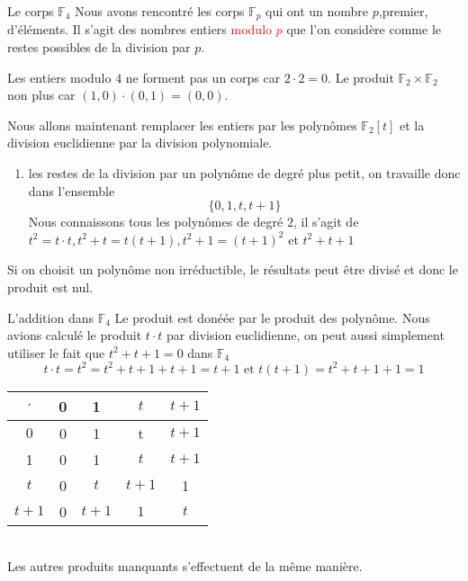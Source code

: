 \begin{parag}{Le corps $\mathbb{F}_4$}
    Nous avons rencontré les corps $ \mathbb{F}_p$ qui ont un nombre $p$,premier, d'éléments. Il s'agit des nombres entiers \textcolor{red}{modulo $p$} que l'on considère comme le restes possibles de la division par $p$.
    \begin{framedremark}
        Les entiers modulo $4$ ne forment pas un corps car $2 \cdot 2 = 0$. Le produit $\mathbb{F}_2 \times \mathbb{F}_2$ non plus car $(1, 0) \cdot (0, 1) = (0, 0)$.
    \end{framedremark}
    Nous allons maintenant remplacer les entiers par les polynômes $\mathbb{F}_2[t]$ et la division euclidienne par la division polynomiale.
    \begin{enumerate}
        \item les restes de la division par un polynôme de degré plus petit, on travaille donc dans l'ensemble
        \[\{0, 1, t, t+1\}\]
        Nous connaissons tous les polynômes de degré $2$, il s'agit de $t^2 = t\cdot t, t^2 + t = t(t+1), t^2+1 = (t+1)^2$ et $t^2 + t + 1$
    \end{enumerate}
    \begin{framedremark}
        Si on choisit un polynôme non irréductible, le résultats peut être divisé et donc le produit est nul.
    \end{framedremark}
    \begin{subparag}{L'addition dans $
    \mathbb{F}_4$}
    Le produit est donéée par le produit des polynôme. Nous avions calculé le produit $t\cdot t$ par division euclidienne, on peut aussi simplement utiliser le fait que $t^2 + t + 1 = 0$ dans $\mathbb{F}_4$
    \[t\cdot t = t^2 = t^2 + t + 1 + t + 1 = t + 1 \text{ et } t(t+1) = t^2 + t + 1 + 1 = 1\]
        
       
           \begin{tabular}{|c||c|c|c|c|}
           \hline
               $\cdot$ &0  & 1 & $t$ & $t+1$\\
               \hline
               \hline
               $0$ & 0 & 1 & t & $t+1$\\
               \hline
                1&0& 1 & $t$ & $t+1$ \\
                \hline
                $t$& 0 & $t$ & $t+1$ &1 \\
                \hline
                $t+1$& 0 & $t+1$ & $1$ & $t$\\
                \hline
           \end{tabular}
        \\
        Les autres produits manquants s'effectuent de la même manière.
        
    \end{subparag}
\end{parag}